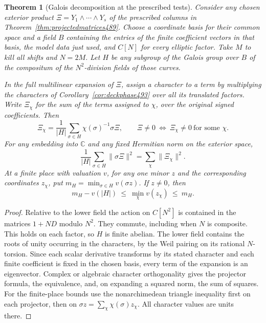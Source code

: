 \documentclass[a4paper,11pt]{article}
\newtheorem{theorem}[proposition]{Theorem}
\theoremstyle{definition}
\theoremstyle{remark}
\numberwithin{equation}{section}
\begin{document}
\begin{theorem}[Galois decomposition at the prescribed tests]\leavevmode
\label{thm:fixedsectors493}
Consider any chosen exterior product \(\Xi=Y_1\wedge\cdots\wedge Y_s\)
of the prescribed columns in Theorem~\ref{thm:projectedmatrices489}.
Choose a coordinate basis for their common space and a field \(B\)
containing the entries of the finite coefficient vectors in that
basis, the model data just used, and \(C[N]\) for every elliptic
factor. Take \(M\) to kill all shifts and \(N=2M\).
Let \(H\) be any subgroup of the Galois group over \(B\) of the
compositum of the \(N^2\)-division fields of those curves.

In the full multilinear expansion of \(\Xi\), assign a character
to a term by multiplying the characters of Corollary~\ref{cor:deckphase493}
over all its translated factors. Write \(\Xi_\chi\) for the sum
of the terms assigned to \(\chi\), over the original signed
coefficients. Then
\[
  \Xi_\chi=\frac1{|H|}\sum_{\sigma\in H}
                \chi(\sigma)^{-1}\sigma\Xi,\qquad
  \Xi\ne0\ \Longleftrightarrow\
          \Xi_\chi\ne0\ \text{for some }\chi .
\]
For any embedding into \(\mathbb C\) and any fixed Hermitian
norm on the exterior space,
\[
       \frac1{|H|}\sum_{\sigma\in H}\|\sigma\Xi\|^2
                       =\sum_\chi\|\Xi_\chi\|^2 .
\]
At a finite place with valuation \(v\), for any one minor \(z\)
and the corresponding coordinates \(z_\chi\), put
\(m_H=\min_{\sigma\in H}v(\sigma z)\).
If \(z\ne0\), then
\[
             m_H-v(|H|)\ \le\ \min_\chi v(z_\chi)
                                  \ \le\ m_H .
\]
\end{theorem}
\begin{proof}
Relative to the lower field the action on \(C[N^2]\) is contained
in the matrices \(1+ND\) modulo \(N^2\). They commute, including
when \(N\) is composite. This holds on each factor, so \(H\) is
finite abelian. The lower field contains the roots of unity
occurring in the characters, by the Weil pairing on its rational
\(N\)-torsion. Since each scalar derivative transforms by its
stated character and each finite coefficient is fixed in the
chosen basis, every term of the expansion is an eigenvector.
Complex or algebraic character orthogonality gives the projector
formula, the equivalence, and, on expanding a squared norm, the
sum of squares. For the finite-place bounds use the nonarchimedean
triangle inequality first on each projector, then on
\(\sigma z=\sum_\chi\chi(\sigma)z_\chi\). All character values
are units there.
\end{proof}
\end{document}
